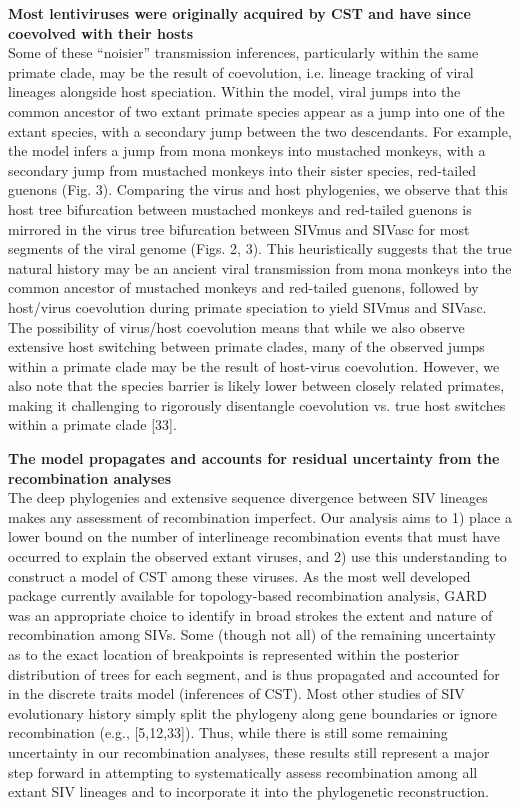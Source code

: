 \textbf{Most lentiviruses were originally acquired by CST and have since coevolved with their hosts}\\
Some of these “noisier” transmission inferences, particularly within the same primate clade, may be the result of coevolution, i.e. lineage tracking of viral lineages alongside host speciation.
Within the model, viral jumps into the common ancestor of two extant primate species appear as a jump into one of the extant species, with a secondary jump between the two descendants.
For example, the model infers a jump from mona monkeys into mustached monkeys, with a secondary jump from mustached monkeys into their sister species, red-tailed guenons (Fig. 3).
Comparing the virus and host phylogenies, we observe that this host tree bifurcation between mustached monkeys and red-tailed guenons is mirrored in the virus tree bifurcation between SIVmus and SIVasc for most segments of the viral genome (Figs. 2, 3).
This heuristically suggests that the true natural history may be an ancient viral transmission from mona monkeys into the common ancestor of mustached monkeys and red-tailed guenons, followed by host/virus coevolution during primate speciation to yield SIVmus and SIVasc.
The possibility of virus/host coevolution means that while we also observe extensive host switching between primate clades, many of the observed jumps within a primate clade may be the result of host-virus coevolution.
However, we also note that the species barrier is likely lower between closely related primates, making it challenging to rigorously disentangle coevolution vs. true host switches within a primate clade [33].


\textbf{The model propagates and accounts for residual uncertainty from the recombination analyses}\\
The deep phylogenies and extensive sequence divergence between SIV lineages makes any assessment of recombination imperfect.
Our analysis aims to 1) place a lower bound on the number of interlineage recombination events that must have occurred to explain the observed extant viruses, and 2) use this understanding to construct a model of CST among these viruses.
As the most well developed package currently available for topology-based recombination analysis, GARD was an appropriate choice to identify in broad strokes the extent and nature of recombination among SIVs.
Some (though not all) of the remaining uncertainty as to the exact location of breakpoints is represented within the posterior distribution of trees for each segment, and is thus propagated and accounted for in the discrete traits model (inferences of CST).
Most other studies of SIV evolutionary history simply split the phylogeny along gene boundaries or ignore recombination (e.g., [5,12,33]).
Thus, while there is still some remaining uncertainty in our recombination analyses, these results still represent a major step forward in attempting to systematically assess recombination among all extant SIV lineages and to incorporate it into the phylogenetic reconstruction.

